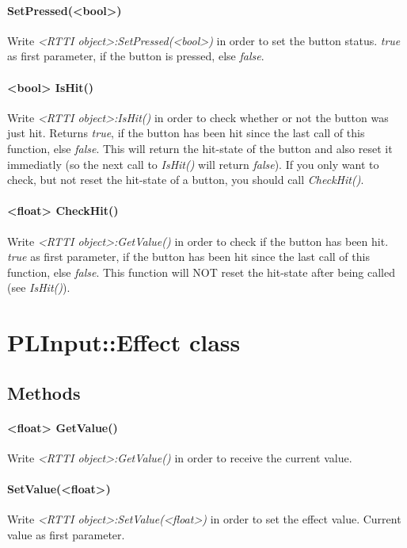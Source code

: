 \paragraph{SetPressed(<bool>)}
Write \emph{<RTTI object>:SetPressed(<bool>)} in order to set the button status. \emph{true} as first parameter, if the button is pressed, else \emph{false}.

\paragraph{<bool> IsHit()}
Write \emph{<RTTI object>:IsHit()} in order to check whether or not the button was just hit. Returns \emph{true}, if the button has been hit since the last call of this function, else \emph{false}. This will return the hit-state of the button and also reset it immediatly (so the next call to \emph{IsHit()} will return \emph{false}). If you only want to check, but not reset the hit-state of a button, you should call \emph{CheckHit()}.

\paragraph{<float> CheckHit()}
Write \emph{<RTTI object>:GetValue()} in order to check if the button has been hit. \emph{true} as first parameter, if the button has been hit since the last call of this function, else \emph{false}. This function will NOT reset the hit-state after being called (see \emph{IsHit()}).




\section{PLInput::Effect class}


\subsection{Methods}

\paragraph{<float> GetValue()}
Write \emph{<RTTI object>:GetValue()} in order to receive the current value.

\paragraph{SetValue(<float>)}
Write \emph{<RTTI object>:SetValue(<float>)} in order to set the effect value. Current value as first parameter.




